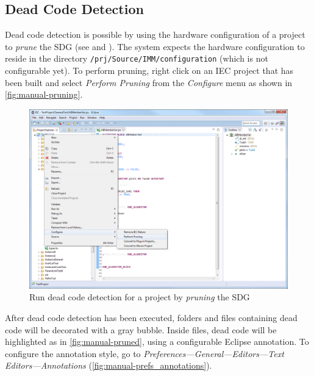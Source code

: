 \clearpage
\subsection{Dead Code Detection}

Dead code detection is possible by using the hardware configuration of a project to \emph{prune} the SDG (see 
\cite{AngererDiss} and \cite{DBLP:conf/splc/AngererPLGG14}). The system expects the hardware configuration to reside in 
the directory \texttt{/prj/Source/IMM/configuration} (which is not configurable yet). To perform pruning, right click 
on an IEC project that has been built and select \emph{Perform Pruning} from the \emph{Configure} menu as shown in 
\autoref{fig:manual-pruning}.

\begin{figure}[htp]
  \centering
    \includegraphics[width=\textwidth]{bilder/manual-pruning}
  \caption{Run dead code detection for a project by \emph{pruning} the SDG}
  \label{fig:manual-pruning}
\end{figure}

After dead code detection has been executed, folders and files containing dead code will be decorated with a gray 
bubble. Inside files, dead code will be highlighted as in \autoref{fig:manual-pruned}, using a configurable Eclipse 
annotation. To configure the annotation style, go to \emph{Preferences---General---Editors---Text 
Editors---Annotations} (\autoref{fig:manual-prefs_annotations}).

